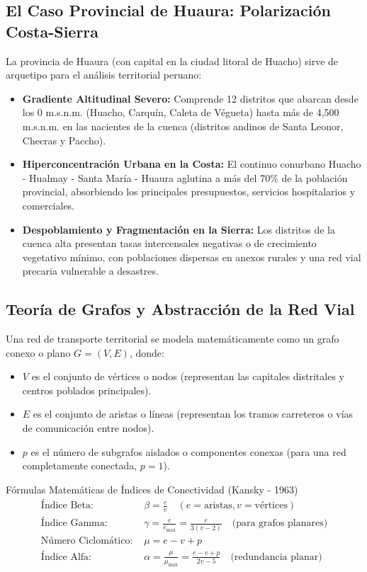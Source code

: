 \documentclass[11pt,a4paper]{article}
\begin{document}
\subsection{El Caso Provincial de Huaura: Polarización Costa-Sierra}
La provincia de Huaura (con capital en la ciudad litoral de Huacho) sirve de arquetipo para el análisis territorial peruano:
\begin{itemize}
    \item \textbf{Gradiente Altitudinal Severo:} Comprende 12 distritos que abarcan desde los 0 m.s.n.m. (Huacho, Carquín, Caleta de Végueta) hasta más de 4,500 m.s.n.m. en las nacientes de la cuenca (distritos andinos de Santa Leonor, Checras y Paccho).
    \item \textbf{Hiperconcentración Urbana en la Costa:} El continuo conurbano Huacho - Hualmay - Santa María - Huaura aglutina a más del 70\% de la población provincial, absorbiendo los principales presupuestos, servicios hospitalarios y comerciales.
    \item \textbf{Despoblamiento y Fragmentación en la Sierra:} Los distritos de la cuenca alta presentan tasas intercensales negativas o de crecimiento vegetativo mínimo, con poblaciones dispersas en anexos rurales y una red vial precaria vulnerable a desastres.
\end{itemize}

\subsection{Teoría de Grafos y Abstracción de la Red Vial}
Una red de transporte territorial se modela matemáticamente como un grafo conexo o plano $G = (V, E)$, donde:
\begin{itemize}
    \item $V$ es el conjunto de vértices o nodos (representan las capitales distritales y centros poblados principales).
    \item $E$ es el conjunto de aristas o líneas (representan los tramos carreteros o vías de comunicación entre nodos).
    \item $p$ es el número de subgrafos aislados o componentes conexas (para una red completamente conectada, $p=1$).
\end{itemize}

\begin{formulabox}{Fórmulas Matemáticas de Índices de Conectividad (Kansky - 1963)}
\begin{align}
\text{Índice Beta: } & \beta = \frac{e}{v} \quad \left(e = \text{aristas}, v = \text{vértices}\right) \\
\text{Índice Gamma: } & \gamma = \frac{e}{e_{\max}} = \frac{e}{3(v - 2)} \quad \text{(para grafos planares)} \\
\text{Número Ciclomático: } & \mu = e - v + p \\
\text{Índice Alfa: } & \alpha = \frac{\mu}{\mu_{\max}} = \frac{e - v + p}{2v - 5} \quad \text{(redundancia planar)}
\end{align}
\end{formulabox}
\end{document}
